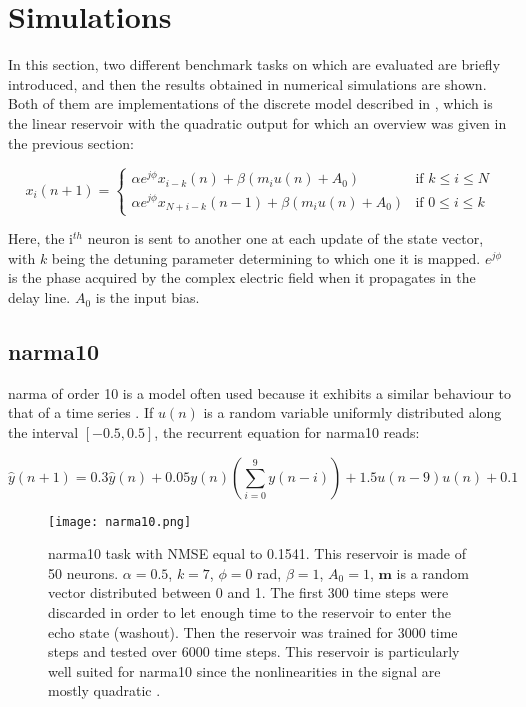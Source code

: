 \section{Simulations}

In this section, two different benchmark tasks on which \rcer are evaluated are briefly introduced, and then the results obtained in numerical simulations are shown. Both of them are implementations of the discrete model described in \cite{Vinckier2015}, which is the linear reservoir with the quadratic output for which an overview was given in the previous section:

\begin{equation}
	x_i(n+1) = 
	\begin{cases}
		\alpha e^{j\phi} x_{i-k}(n)+\beta \left(m_i u(n) +A_0 \right) & \text{if } k \leq i \leq N\\
		\alpha e^{j\phi} x_{N+i-k}(n-1)+\beta \left(m_i u(n) +A_0 \right) & \text{if } 0 \leq i \leq k			
	\end{cases}
\end{equation}

Here, the $\text{i}^{th}$ neuron is sent to another one at each update of the state vector, with $k$ being the detuning parameter determining to which one it is mapped. $e^{j\phi}$ is the phase acquired by the complex electric field when it propagates in the delay line. $A_0$ is the input bias.

\subsection{\gls{narma}10}

\acrlong{narma} of order 10 is a model often used because it exhibits a similar behaviour to that of a time series \cite{Paquot2012}. If $u(n)$ is a random variable uniformly distributed along the interval $[-0.5, 0.5]$, the recurrent equation for \gls{narma}10 reads:

\begin{equation}
	\hat{y}(n+1) = 0.3\hat{y}(n)+0.05y(n)\left(\sum_{i=0}^9 y(n-i) \right)+1.5u(n-9)u(n)+0.1
\end{equation}

\begin{figure}[h]
	\centering
	\texttt{[image: narma10.png]}
	\caption{\gls{narma}10 task with NMSE equal to 0.1541. This reservoir is made of 50 neurons. $\alpha=0.5$, $k=7$, $\phi=0$ rad, $\beta=1$, $A_0=1$, $\mathbf{m}$ is a random vector distributed between 0 and 1. The first 300 time steps were discarded in order to let enough time to the reservoir to enter the echo state (washout). Then the reservoir was trained for 3000 time steps and tested over 6000 time steps. This reservoir is particularly well suited for  \gls{narma}10 since the nonlinearities in the signal are mostly quadratic \cite{Vinckier2015}.}
	\label{narma10}
\end{figure}

